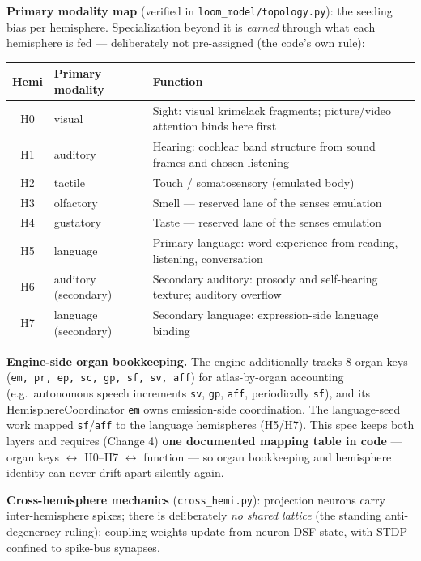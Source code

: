 \documentclass[11pt]{article}
\begin{document}
\textbf{Primary modality map} (verified in
\texttt{loom\_model/topology.py}): the seeding bias per hemisphere.
Specialization beyond it is \emph{earned} through what each hemisphere is
fed — deliberately not pre-assigned (the code's own rule):

\begin{longtable}{c l p{}}
\toprule
\textbf{Hemi} & \textbf{Primary modality} & \textbf{Function} \\
\midrule
H0 & visual & Sight: visual krimelack fragments; picture/video attention
binds here first \\
H1 & auditory & Hearing: cochlear band structure from sound frames and
chosen listening \\
H2 & tactile & Touch / somatosensory (emulated body) \\
H3 & olfactory & Smell — reserved lane of the senses emulation \\
H4 & gustatory & Taste — reserved lane of the senses emulation \\
H5 & language & Primary language: word experience from reading, listening,
conversation \\
H6 & auditory (secondary) & Secondary auditory: prosody and self-hearing
texture; auditory overflow \\
H7 & language (secondary) & Secondary language: expression-side language
binding \\
\bottomrule
\end{longtable}

\textbf{Engine-side organ bookkeeping.} The engine additionally tracks 8
organ keys (\texttt{em, pr, ep, sc, gp, sf, sv, aff}) for atlas-by-organ
accounting (e.g.\ autonomous speech increments \texttt{sv}, \texttt{gp},
\texttt{aff}, periodically \texttt{sf}), and its HemisphereCoordinator
\texttt{em} owns emission-side coordination. The language-seed work mapped
\texttt{sf}/\texttt{aff} to the language hemispheres (H5/H7). This spec
keeps both layers and requires (Change 4) \textbf{one documented mapping
table in code} — organ keys $\leftrightarrow$ H0--H7 $\leftrightarrow$
function — so organ bookkeeping and hemisphere identity can never drift
apart silently again.

\textbf{Cross-hemisphere mechanics} (\texttt{cross\_hemi.py}): projection
neurons carry inter-hemisphere spikes; there is deliberately \emph{no shared
lattice} (the standing anti-degeneracy ruling); coupling weights update
from neuron DSF state, with STDP confined to spike-bus synapses.
\end{document}
